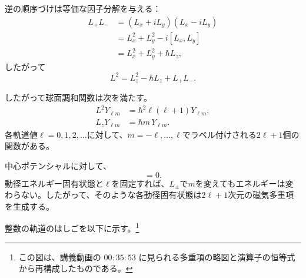 逆の順序づけは等価な因子分解を与える：
\begin{align}
L_+L_-
&=(L_x+iL_y)(L_x-iL_y) \\
&=L_x^2+L_y^2-i[L_x,L_y] \\
&=L_x^2+L_y^2+\hbar L_z,
\end{align}
したがって
\begin{equation}
L^2=L_z^2-\hbar L_z+L_+L_-.
\end{equation}

\begin{classroomqa}
\end{classroomqa}

したがって球面調和関数は次を満たす。
\begin{align}
L^2Y_{\ell m}
&=\hbar^2\ell(\ell+1)Y_{\ell m}, \\
L_zY_{\ell m}
&=\hbar m\,Y_{\ell m}.
\end{align}
各軌道値\(\ell=0,1,2,\ldots\)に対して、\(m=-\ell,\ldots,\ell\)でラベル付けされる\(2\ell+1\)個の関数がある。

中心ポテンシャルに対して、
\begin{equation}
[H,L_i]=0.
\end{equation}
動径エネルギー固有状態と\(\ell\)を固定すれば、\(L_\pm\)で\(m\)を変えてもエネルギーは変わらない。したがって、そのような各動径固有状態は\(2\ell+1\)次元の磁気多重項を生成する。

整数の軌道のはしごを以下に示す。\footnote{この図は、講義動画の \(00{:}35{:}53\) に見られる多重項の略図と演算子の恒等式から再構成したものである。}

